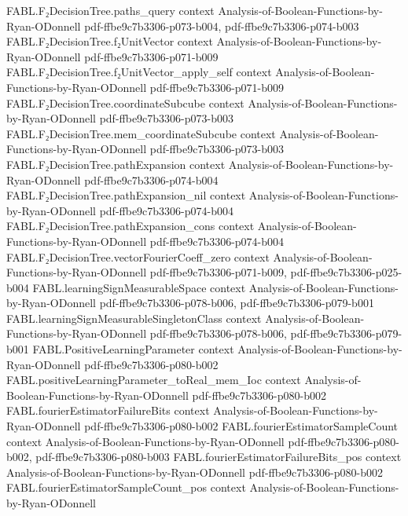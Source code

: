 \begin{theorem}
\proofstep
  {FABL.F₂DecisionTree.paths_query}
  {context}
  {Analysis-of-Boolean-Functions-by-Ryan-ODonnell}
  {pdf-ffbe9c7b3306-p073-b004,
    pdf-ffbe9c7b3306-p074-b003}
\proofstep
  {FABL.F₂DecisionTree.f₂UnitVector}
  {context}
  {Analysis-of-Boolean-Functions-by-Ryan-ODonnell}
  {pdf-ffbe9c7b3306-p071-b009}
\proofstep
  {FABL.F₂DecisionTree.f₂UnitVector_apply_self}
  {context}
  {Analysis-of-Boolean-Functions-by-Ryan-ODonnell}
  {pdf-ffbe9c7b3306-p071-b009}
\proofstep
  {FABL.F₂DecisionTree.coordinateSubcube}
  {context}
  {Analysis-of-Boolean-Functions-by-Ryan-ODonnell}
  {pdf-ffbe9c7b3306-p073-b003}
\proofstep
  {FABL.F₂DecisionTree.mem_coordinateSubcube}
  {context}
  {Analysis-of-Boolean-Functions-by-Ryan-ODonnell}
  {pdf-ffbe9c7b3306-p073-b003}
\proofstep
  {FABL.F₂DecisionTree.pathExpansion}
  {context}
  {Analysis-of-Boolean-Functions-by-Ryan-ODonnell}
  {pdf-ffbe9c7b3306-p074-b004}
\proofstep
  {FABL.F₂DecisionTree.pathExpansion_nil}
  {context}
  {Analysis-of-Boolean-Functions-by-Ryan-ODonnell}
  {pdf-ffbe9c7b3306-p074-b004}
\proofstep
  {FABL.F₂DecisionTree.pathExpansion_cons}
  {context}
  {Analysis-of-Boolean-Functions-by-Ryan-ODonnell}
  {pdf-ffbe9c7b3306-p074-b004}
\proofstep
  {FABL.F₂DecisionTree.vectorFourierCoeff_zero}
  {context}
  {Analysis-of-Boolean-Functions-by-Ryan-ODonnell}
  {pdf-ffbe9c7b3306-p071-b009,
    pdf-ffbe9c7b3306-p025-b004}
\proofstep
  {FABL.learningSignMeasurableSpace}
  {context}
  {Analysis-of-Boolean-Functions-by-Ryan-ODonnell}
  {pdf-ffbe9c7b3306-p078-b006,
    pdf-ffbe9c7b3306-p079-b001}
\proofstep
  {FABL.learningSignMeasurableSingletonClass}
  {context}
  {Analysis-of-Boolean-Functions-by-Ryan-ODonnell}
  {pdf-ffbe9c7b3306-p078-b006,
    pdf-ffbe9c7b3306-p079-b001}
\proofstep
  {FABL.PositiveLearningParameter}
  {context}
  {Analysis-of-Boolean-Functions-by-Ryan-ODonnell}
  {pdf-ffbe9c7b3306-p080-b002}
\proofstep
  {FABL.positiveLearningParameter_toReal_mem_Ioc}
  {context}
  {Analysis-of-Boolean-Functions-by-Ryan-ODonnell}
  {pdf-ffbe9c7b3306-p080-b002}
\proofstep
  {FABL.fourierEstimatorFailureBits}
  {context}
  {Analysis-of-Boolean-Functions-by-Ryan-ODonnell}
  {pdf-ffbe9c7b3306-p080-b002}
\proofstep
  {FABL.fourierEstimatorSampleCount}
  {context}
  {Analysis-of-Boolean-Functions-by-Ryan-ODonnell}
  {pdf-ffbe9c7b3306-p080-b002,
    pdf-ffbe9c7b3306-p080-b003}
\proofstep
  {FABL.fourierEstimatorFailureBits_pos}
  {context}
  {Analysis-of-Boolean-Functions-by-Ryan-ODonnell}
  {pdf-ffbe9c7b3306-p080-b002}
\proofstep
  {FABL.fourierEstimatorSampleCount_pos}
  {context}
  {Analysis-of-Boolean-Functions-by-Ryan-ODonnell}

\end{theorem}
